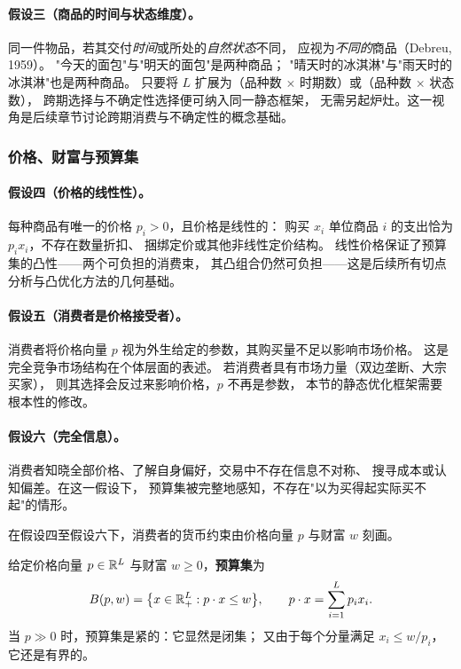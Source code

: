 \paragraph{假设三（商品的时间与状态维度）。}
同一件物品，若其交付\emph{时间}或所处的\emph{自然状态}不同，
应视为\emph{不同的}商品（Debreu, 1959）。
"今天的面包"与"明天的面包"是两种商品；
"晴天时的冰淇淋"与"雨天时的冰淇淋"也是两种商品。
只要将 $L$ 扩展为（品种数 $\times$ 时期数）或（品种数 $\times$ 状态数），
跨期选择与不确定性选择便可纳入同一静态框架，
无需另起炉灶。这一视角是后续章节讨论跨期消费与不确定性的概念基础。

\subsubsection{价格、财富与预算集}
\label{subsec:budget-set}

\paragraph{假设四（价格的线性性）。}
每种商品有唯一的价格 $p_i>0$，且价格是线性的：
购买 $x_i$ 单位商品 $i$ 的支出恰为 $p_i x_i$，不存在数量折扣、
捆绑定价或其他非线性定价结构。
线性价格保证了预算集的凸性——两个可负担的消费束，
其凸组合仍然可负担——这是后续所有切点分析与凸优化方法的几何基础。

\paragraph{假设五（消费者是价格接受者）。}
消费者将价格向量 $p$ 视为外生给定的参数，其购买量不足以影响市场价格。
这是完全竞争市场结构在个体层面的表述。
若消费者具有市场力量（双边垄断、大宗买家），
则其选择会反过来影响价格，$p$ 不再是参数，
本节的静态优化框架需要根本性的修改。

\paragraph{假设六（完全信息）。}
消费者知晓全部价格、了解自身偏好，交易中不存在信息不对称、
搜寻成本或认知偏差。在这一假设下，
预算集被完整地感知，不存在"以为买得起实际买不起"的情形。

在假设四至假设六下，消费者的货币约束由价格向量 $p$ 与财富 $w$ 刻画。

\begin{definition}[预算集]\label{def:budget-set}
给定价格向量 $p\in\mathbb{R}^L$ 与财富 $w\geq 0$，\textbf{预算集}为
\[
  B(p,w)=\bigl\{x\in\mathbb{R}^L_+: p\cdot x\leq w\bigr\},
  \qquad
  p\cdot x=\sum_{i=1}^{L}p_i x_i .
\]
当 $p\gg 0$ 时，预算集是紧的：它显然是闭集；
又由于每个分量满足 $x_i\leq w/p_i$，它还是有界的。
\end{definition}

